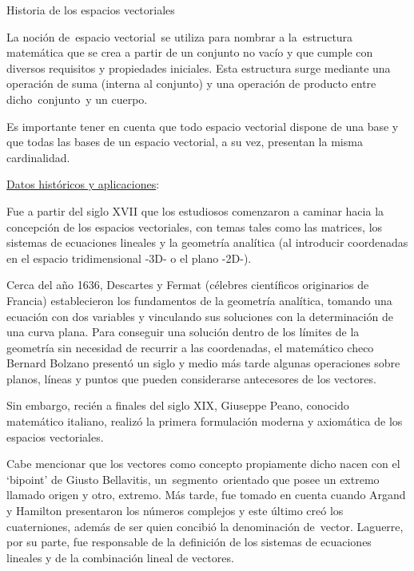 \begin{myexampleblock}{Historia de los espacios vectoriales}


La noción de espacio vectorial se utiliza para nombrar a la estructura matemática que se crea a partir de un conjunto no vacío y que cumple con diversos requisitos y propiedades iniciales. Esta estructura surge mediante una operación de suma (interna al conjunto) y una operación de producto entre dicho conjunto y un cuerpo.

\vspace{2mm} Es importante tener en cuenta que todo espacio vectorial dispone de una base y que todas las bases de un espacio vectorial, a su vez, presentan la misma cardinalidad.

\vspace{2mm} \underline{Datos históricos y aplicaciones}:

\vspace{2mm} Fue a partir del siglo XVII que los estudiosos comenzaron a caminar hacia la concepción de los espacios vectoriales, con temas tales como las matrices, los sistemas de ecuaciones lineales y la geometría analítica (al introducir coordenadas en el espacio tridimensional -3D- o el plano -2D-).

\vspace{2mm} Cerca del año 1636, Descartes y Fermat (célebres científicos originarios de Francia) establecieron los fundamentos de la geometría analítica, tomando una ecuación con dos variables y vinculando sus soluciones con la determinación de una curva plana. Para conseguir una solución dentro de los límites de la geometría sin necesidad de recurrir a las coordenadas, el matemático checo Bernard Bolzano presentó un siglo y medio más tarde algunas operaciones sobre planos, líneas y puntos que pueden considerarse antecesores de los vectores.

\vspace{2mm} Sin embargo, recién a finales del siglo XIX, Giuseppe Peano, conocido matemático italiano, realizó la primera formulación moderna y axiomática de los espacios vectoriales. 

\vspace{2mm} Cabe mencionar que los vectores como concepto propiamente dicho nacen con el `bipoint’ de Giusto Bellavitis, un segmento orientado que posee un extremo llamado origen y otro, extremo. Más tarde, fue tomado en cuenta cuando Argand y Hamilton presentaron los números complejos y este último creó los cuaterniones, además de ser quien concibió la denominación de vector. Laguerre, por su parte, fue responsable de la definición de los sistemas de ecuaciones lineales y de la combinación lineal de vectores.


\end{myexampleblock}
